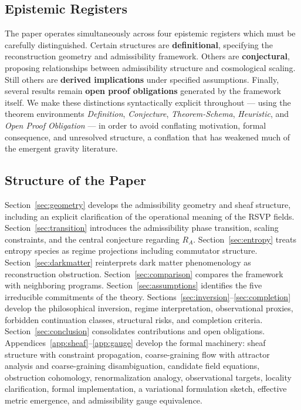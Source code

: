 \documentclass[11pt, a4paper]{article}
\theoremstyle{plain}
\theoremstyle{definition}
\theoremstyle{remark}
\newcommand{\RA}{R_{\!A}}
\begin{document}
\subsection*{Epistemic Registers}

The paper operates simultaneously across four epistemic registers which must be
carefully distinguished. Certain structures are \textbf{definitional}, specifying
the reconstruction geometry and admissibility framework. Others are
\textbf{conjectural}, proposing relationships between admissibility structure and
cosmological scaling. Still others are \textbf{derived implications} under specified
assumptions. Finally, several results remain \textbf{open proof obligations}
generated by the framework itself. We make these distinctions syntactically explicit
throughout --- using the theorem environments \emph{Definition}, \emph{Conjecture},
\emph{Theorem-Schema}, \emph{Heuristic}, and \emph{Open Proof Obligation} --- in
order to avoid conflating motivation, formal consequence, and unresolved structure, a
conflation that has weakened much of the emergent gravity literature.

\subsection*{Structure of the Paper}

Section~\ref{sec:geometry} develops the admissibility geometry and sheaf structure,
including an explicit clarification of the operational meaning of the RSVP fields.
Section~\ref{sec:transition} introduces the admissibility phase transition, scaling
constraints, and the central conjecture regarding $\RA$.
Section~\ref{sec:entropy} treats entropy species as regime projections including
commutator structure.  Section~\ref{sec:darkmatter} reinterprets dark matter
phenomenology as reconstruction obstruction.  Section~\ref{sec:comparison} compares
the framework with neighboring programs.  Section~\ref{sec:assumptions} identifies
the five irreducible commitments of the theory.
Sections~\ref{sec:inversion}--\ref{sec:completion} develop the philosophical
inversion, regime interpretation, observational proxies, forbidden continuation
classes, structural risks, and completion criteria.
Section~\ref{sec:conclusion} consolidates contributions and open
obligations. Appendices~\ref{app:sheaf}--\ref{app:gauge} develop the formal
machinery: sheaf structure with constraint propagation, coarse-graining flow with
attractor analysis and coarse-graining disambiguation, candidate field equations,
obstruction cohomology, renormalization analogy, observational targets, locality
clarification, formal implementation, a variational formulation sketch, effective
metric emergence, and admissibility gauge equivalence.
\end{document}
